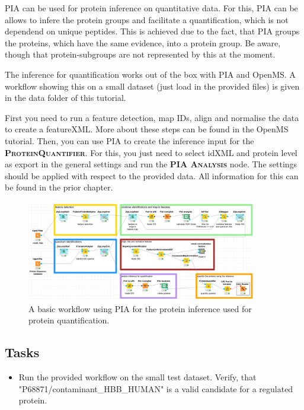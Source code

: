 \documentclass[a4paper,11pt,twoside]{article}
\newcommand{\knimenode}[1]{{\scshape\bfseries #1}}
\begin{document}
PIA can be used for protein inference on quantitative data. For this, PIA can be
allows to infere the protein groups and facilitate a quantification, which is
not dependend on unique peptides. This is achieved due to the fact, that PIA
groups the proteins, which have the same evidence, into a protein group. Be
aware, though that protein-subgroups are not represented by this at the moment.

The inference for quantification works out of the box with PIA and OpenMS. A
workflow showing this on a small dataset (just load in the provided files) is
given in the data folder of this tutorial.

First you need to run a feature detection, map IDs, align and normalise
the data to create a featureXML. More about these steps can be found in the
OpenMS tutorial. Then, you can use PIA to create the inference input for the
\knimenode{ProteinQuantifier}. For this, you just need to select idXML and
protein level as export in the general settings and run the
\knimenode{PIA Analysis} node. The settings should be applied with respect to
the provided data. All information for this can be found in the prior chapter.

\begin{figure}[ht!]
	\centering
	\includegraphics[width=0.9\textwidth]{graphics/quant_workflow}
	\caption{A basic workflow using PIA for the protein inference used for
	protein quantification.}
	\label{quant_workflow}
\end{figure}

\subsection{Tasks}

\begin{itemize}
	\item Run the provided workflow on the small test dataset. Verify, that\\
	"P68871/contaminant\_HBB\_HUMAN" is a valid candidate for a regulated protein.
\end{itemize}
\end{document}
